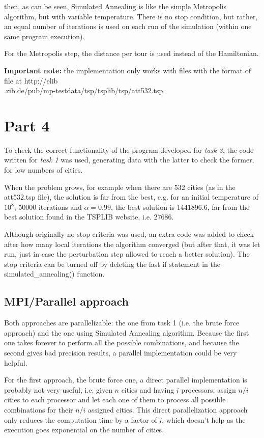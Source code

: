 \documentclass[paper=a4, fontsize=11pt]{scrartcl} %
\numberwithin{equation}{section} %
\numberwithin{figure}{section} %
\numberwithin{table}{section} %
\begin{document}
then, as can be seen, Simulated Annealing is like the simple Metropolis algorithm, but with variable temperature. There is no stop condition, but rather, an equal number of iterations is used on each run of the simulation (within one same program execution).

For the Metropolis step, the distance per tour is used instead of the Hamiltonian.

\textbf{Important note:} the implementation only works with files with the format of file at http://elib\\.zib.de/pub/mp-testdata/tsp/tsplib/tsp/att532.tsp.




\section{Part 4}

To check the correct functionality of the program developed for \textit{task 3}, the code written for \textit{task 1} was used, generating data with the latter to check the former, for low numbers of cities.

When the problem grows, for example when there are 532 cities (as in the att532.tsp file), the solution is far from the best, e.g. for an initial temperature of $10^8$, 50000 iterations and $\alpha = 0.99$, the best solution is 1441896.6, far from the best solution found in the TSPLIB website, i.e. 27686.

Although originally no stop criteria was used, an extra code was added to check after how many local iterations the algorithm converged (but after that, it was let run, just in case the perturbation step allowed to reach a better solution). The stop criteria can be turned off by deleting the last if statement in the simulated\_annealing() function.


\subsection{MPI/Parallel approach}

Both approaches are parallelizable: the one from task 1 (i.e. the brute force approach) and the one using Simulated Annealing algorithm. Because the first one takes forever to perform all the possible combinations, and because the second gives bad precision results, a parallel implementation could be very helpful.

For the first approach, the brute force one, a direct parallel implementation is probably not very useful, i.e. given $n$ cities and having $i$ processors, assign $n/i$ cities to each processor and let each one of them to process all possible combinations for their $n/i$ assigned cities. This direct parallelization approach only reduces the computation time by a factor of $i$, which doesn't help as the execution goes exponential on the number of cities.
\end{document}
